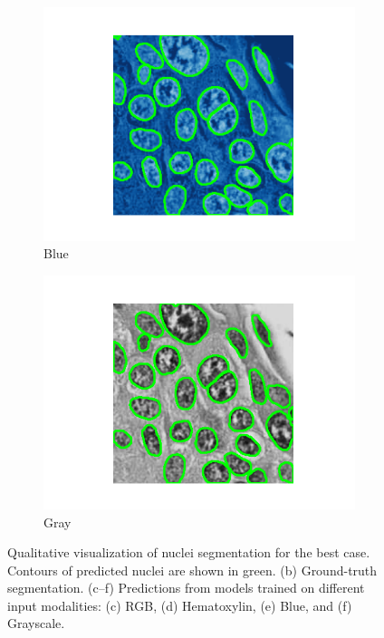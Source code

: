 \documentclass[target=bach,aauheader=,style=]{thud}
\begin{document}
\begin{figure}[!htbp]
\begin{subfigure}{0.48\textwidth}
  \centering
  \includegraphics[width=\linewidth]{imgs/qualitative/best/Blu/contour_img.png}
  \caption{Blue}
\end{subfigure}\hfill
\begin{subfigure}{0.48\textwidth}
  \centering
  \includegraphics[width=\linewidth]{imgs/qualitative/best/Gray/contour_img.png}
  \caption{Gray}
\end{subfigure}

\caption{Qualitative visualization of nuclei segmentation for the best case. 
Contours of predicted nuclei are shown in green. 
(b) Ground-truth segmentation. 
(c--f) Predictions from models trained on different input modalities: (c) RGB, (d) Hematoxylin, (e) Blue, and (f) Grayscale.}
\label{fig:qual_best}
\end{figure}
\end{document}
